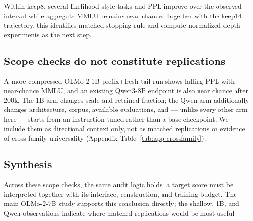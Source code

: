 Within keep8, several likelihood-style tasks and PPL improve over the observed
interval while aggregate MMLU remains near chance. Together with the keep14
trajectory, this identifies matched stopping-rule and compute-normalized depth
experiments as the next step.

\subsection{Scope checks do not constitute replications}
A more compressed OLMo-2-1B prefix+fresh-tail run shows falling PPL with
near-chance MMLU, and an existing Qwen3-8B endpoint is also near chance after
200k. The 1B arm changes scale and retained fraction; the Qwen arm additionally
changes architecture, corpus, available evaluations, and --- unlike every other
arm here --- starts from an instruction-tuned rather than a base checkpoint. We
include them as directional context only, not as matched replications or evidence
of cross-family universality (Appendix Table~\ref{tab:app-crossfamily}).

\subsection{Synthesis}
Across these scope checks, the same audit logic holds: a target score must be
interpreted together with its interface, construction, and training budget.
The main OLMo-2-7B study supports this conclusion directly; the shallow, 1B,
and Qwen observations indicate where matched replications would be most useful.
